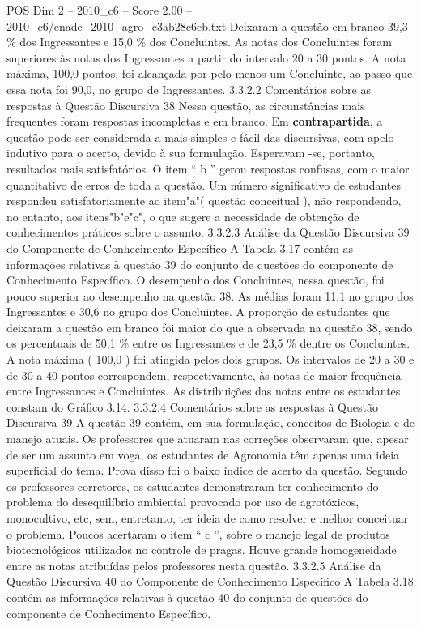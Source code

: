 \begin{textsample}{POS Dim 2 – 2010\_c6 – Score 2.00 – 2010\_c6/enade\_2010\_agro\_c3ab28c6eb.txt}
Deixaram a questão em branco 39,3 \% dos Ingressantes e 15,0 \% dos Concluintes.
As notas dos Concluintes foram superiores às notas dos Ingressantes a partir do intervalo 20 a 30 pontos.
A nota máxima, 100,0 pontos, foi alcançada por pelo menos um Concluinte, ao passo que essa nota foi 90,0, no grupo de Ingressantes. 3.3.2.2 Comentários sobre as respostas à Questão Discursiva 38 Nessa questão, as circunstâncias mais frequentes foram respostas incompletas e em branco.
Em \textbf{contrapartida}, a questão pode ser considerada a mais simples e fácil das discursivas, com apelo indutivo para o acerto, devido à sua formulação.
Esperavam -se, portanto, resultados mais satisfatórios.
O item “ b ” gerou respostas confusas, com o maior quantitativo de erros de toda a questão.
Um número significativo de estudantes respondeu satisfatoriamente ao item"a"( questão conceitual ), não respondendo, no entanto, aos itens"b"e"c", o que sugere a necessidade de obtenção de conhecimentos práticos sobre o assunto. 3.3.2.3 Análise da Questão Discursiva 39 do Componente de Conhecimento Específico A Tabela 3.17 contém as informações relativas à questão 39 do conjunto de questões do componente de Conhecimento Específico.
O desempenho dos Concluintes, nessa questão, foi pouco superior ao desempenho na questão 38.
As médias foram 11,1 no grupo dos Ingressantes e 30,6 no grupo dos Concluintes.
A proporção de estudantes que deixaram a questão em branco foi maior do que a observada na questão 38, sendo os percentuais de 50,1 \% entre os Ingressantes e de 23,5 \% dentre os Concluintes.
A nota máxima ( 100,0 ) foi atingida pelos dois grupos.
Os intervalos de 20 a 30 e de 30 a 40 pontos correspondem, respectivamente, às notas de maior frequência entre Ingressantes e Concluintes.
As distribuições das notas entre os estudantes constam do Gráfico 3.14. 3.3.2.4 Comentários sobre as respostas à Questão Discursiva 39 A questão 39 contém, em sua formulação, conceitos de Biologia e de manejo atuais.
Os professores que atuaram nas correções observaram que, apesar de ser um assunto em voga, os estudantes de Agronomia têm apenas uma ideia superficial do tema.
Prova disso foi o baixo índice de acerto da questão.
Segundo os professores corretores, os estudantes demonstraram ter conhecimento do problema do desequilíbrio ambiental provocado por uso de agrotóxicos, monocultivo, etc, sem, entretanto, ter ideia de como resolver e melhor conceituar o problema.
Poucos acertaram o item “ c ”, sobre o manejo legal de produtos biotecnológicos utilizados no controle de pragas.
Houve grande homogeneidade entre as notas atribuídas pelos professores nesta questão. 3.3.2.5 Análise da Questão Discursiva 40 do Componente de Conhecimento Específico A Tabela 3.18 contém as informações relativas à questão 40 do conjunto de questões do componente de Conhecimento Específico.

\end{textsample}
